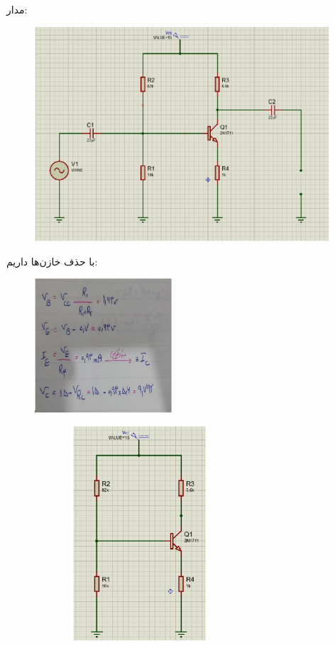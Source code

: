 \documentclass[12pt]{article}
\begin{document}
مدار:
\begin{figure}[H]
	\begin{center}
		\includegraphics[width=\textwidth, height=8cm]{./images/9.7}
	\end{center}
\end{figure}

با حذف خازن‌‌ها داریم:
\begin{figure}[H]
	\begin{center}
		\includegraphics[width=\textwidth, height=5cm]{./images/9.7.1}
	\end{center}
\end{figure}

\begin{figure}[H]
	\begin{center}
		\includegraphics[width=0.7\textwidth, height=8cm]{./images/9.8}
	\end{center}
\end{figure}
\end{document}
